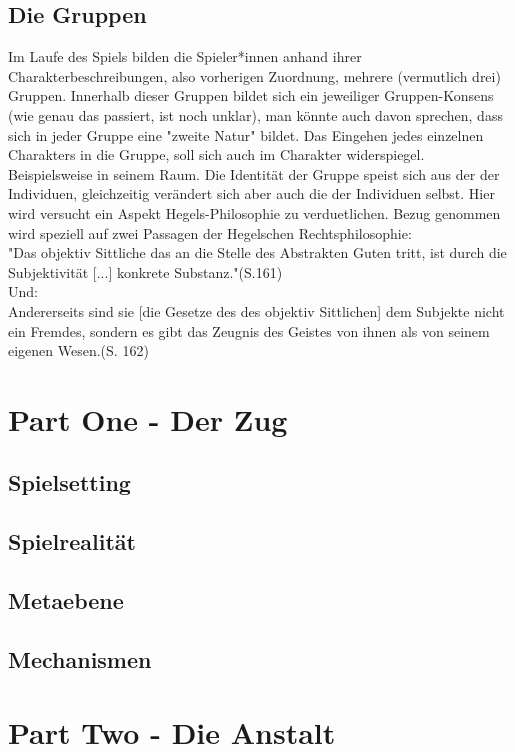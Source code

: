 \documentclass[a4paper, 12pt]{scrartcl}
\begin{document}
    \subsection{Die Gruppen}
    Im Laufe des Spiels bilden die Spieler*innen anhand ihrer Charakterbeschreibungen, also vorherigen Zuordnung, mehrere (vermutlich drei) Gruppen. 
    Innerhalb dieser Gruppen bildet sich ein jeweiliger Gruppen-Konsens (wie genau das passiert, ist noch unklar), man könnte auch davon sprechen, dass sich in jeder Gruppe eine "zweite Natur" bildet. Das Eingehen jedes einzelnen Charakters in die Gruppe, soll sich auch im Charakter widerspiegel. Beispielsweise in seinem Raum. Die Identität der Gruppe speist sich aus der der Individuen, gleichzeitig verändert sich aber auch die der Individuen selbst. Hier wird versucht ein Aspekt Hegels-Philosophie zu verduetlichen. Bezug genommen wird speziell auf zwei Passagen der Hegelschen Rechtsphilosophie: \\
    "Das objektiv Sittliche das an die Stelle des Abstrakten Guten tritt, ist durch die Subjektivität [...] konkrete Substanz."(S.161) \\
    Und:\\
    \glqq Andererseits sind sie [die Gesetze des des objektiv Sittlichen] dem Subjekte nicht ein Fremdes, sondern es gibt das Zeugnis des Geistes von ihnen als von seinem eigenen Wesen.\grqq (S. 162)

    \section{Part One - Der Zug}
    \subsection{Spielsetting}
    \subsection{Spielrealität}
    \subsection{Metaebene}
    \subsection{Mechanismen}

    \section{Part Two - Die Anstalt}
\end{document}
